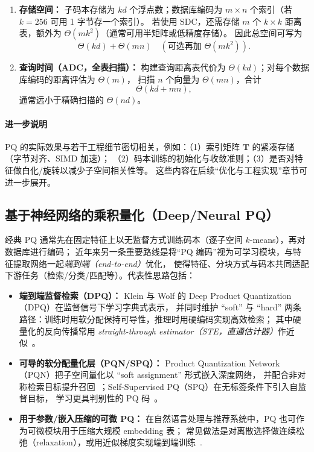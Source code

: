 \documentclass[lang=cn,newtx,10pt,scheme=chinese,chinesefont=nofont,citestyle=gb7714-2015, bibstyle=gb7714-2015]{elegantbook}
\begin{document}
\begin{refsection}
\begin{enumerate}
\item \textbf{存储空间：}
子码本存储为 $kd$ 个浮点数；数据库编码为 $m\times n$ 个索引（若 $k=256$ 可用 1 字节存一个索引）。
若使用 SDC，还需存储 $m$ 个 $k\times k$ 距离表，额外为 $\Theta(mk^2)$（通常可用半矩阵或低精度存储）。
因此总空间可写为
\[
\Theta(kd) + \Theta(mn) \quad (\text{可选再加 } \Theta(mk^2)).
\]

\item \textbf{查询时间（ADC，全表扫描）：}
构建查询距离表代价为 $\Theta(kd)$；对每个数据库编码的距离评估为 $\Theta(m)$，
扫描 $n$ 个向量为 $\Theta(mn)$，合计
\[
\Theta(kd + mn),
\]
通常远小于精确扫描的 $\Theta(nd)$。
\end{enumerate}

\paragraph{进一步说明}
PQ 的实际效果与若干工程细节密切相关，例如：（1）索引矩阵 $\mathbf{T}$ 的紧凑存储（字节对齐、SIMD 加速）；
（2）码本训练的初始化与收敛准则；（3）是否对特征做白化/旋转以减少子空间相关性等。
这些内容在后续“优化与工程实现”章节可进一步展开。

\subsection{基于神经网络的乘积量化（Deep/Neural PQ）}
经典 PQ 通常先在固定特征上以无监督方式训练码本（逐子空间 $k$-means），再对数据库进行编码；
近年来另一条重要路线是将“PQ 编码”视为可学习模块，与特征提取网络一起\emph{端到端（end-to-end）}优化，
使得特征、分块方式与码本共同适配下游任务（检索/分类/匹配等）。代表性思路包括：

\begin{itemize}
\item \textbf{端到端监督检索（DPQ）：}
Klein 与 Wolf 的 Deep Product Quantization（DPQ）在监督信号下学习字典式表示，
并同时维护 ``soft'' 与 ``hard'' 两条路径：训练时用软分配保持可导性，推理时用硬编码实现高效检索；
其中硬量化的反向传播常用 \emph{straight-through estimator（STE，直通估计器）}作近似~\cite{klein2019dpq}。

\item \textbf{可导的软分配量化层（PQN/SPQ）：}
Product Quantization Network（PQN）把子空间量化以 ``soft assignment'' 形式嵌入深度网络，
并配合非对称检索目标提升召回~\cite{yu2018pqn}；Self-Supervised PQ（SPQ）在无标签条件下引入自监督目标，
学习更具判别性的 PQ 码~\cite{jang2021spq}。

\item \textbf{用于参数/嵌入压缩的可微 PQ：}
在自然语言处理与推荐系统中，PQ 也可作为可微模块用于压缩大规模 embedding 表；
常见做法是对离散选择做连续松弛（relaxation），或用近似梯度实现端到端训练~\cite{chen2020dpq}.
\end{itemize}


\end{refsection}
\end{document}
